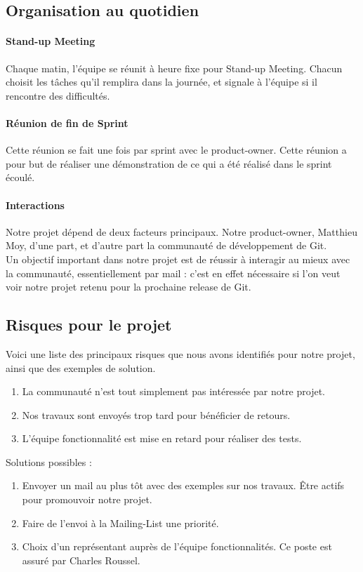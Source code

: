 \documentclass[11pt]{article}
\begin{document}
\subsection{Organisation au quotidien}
\paragraph{Stand-up Meeting}
Chaque matin, l'équipe se réunit à heure fixe pour Stand-up Meeting.
Chacun choisit les tâches qu'il remplira dans la journée, et signale à l'équipe si il rencontre des difficultés. 
\paragraph{Réunion de fin de Sprint}
Cette réunion se fait une fois par sprint avec le product-owner. Cette réunion a pour but de réaliser une démonstration de ce qui a été réalisé dans le sprint écoulé.
\paragraph{Interactions}
Notre projet dépend de deux facteurs principaux. Notre product-owner, Matthieu Moy, d'une part, et d'autre part la communauté de développement de Git.\\
Un objectif important dans notre projet est de réussir à interagir au mieux avec la communauté, essentiellement par mail : c'est en effet nécessaire si l'on veut voir notre projet retenu pour la prochaine release de Git.
\subsection{Risques pour le projet}
Voici une liste des principaux risques que nous avons identifiés pour notre projet, ainsi que des exemples de solution.
\begin{enumerate}
\item La communauté n'est tout simplement pas intéressée par notre projet. 
\item Nos travaux sont envoyés trop tard pour bénéficier de retours.
\item L'équipe fonctionnalité est mise en retard pour réaliser des tests.
\end{enumerate}

Solutions possibles :
\begin{enumerate}
\item Envoyer un mail au plus tôt avec des exemples sur nos travaux. Être actifs pour promouvoir notre projet.
\item Faire de l'envoi à la Mailing-List une priorité.
\item Choix d'un représentant auprès de l'équipe fonctionnalités. Ce poste est assuré par Charles Roussel. 
\end{enumerate}
\end{document}
